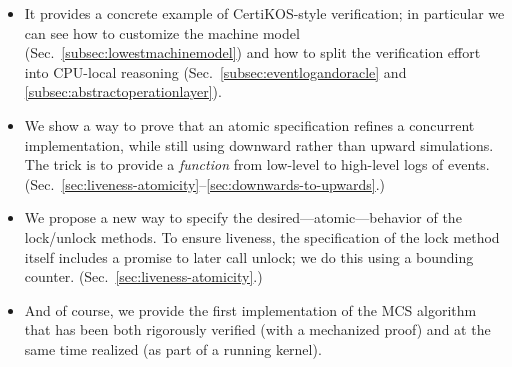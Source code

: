\begin{itemize}
\item It provides a concrete example of CertiKOS-style verification; in particular we can see how to customize the machine model (Sec.~\ref{subsec:lowestmachinemodel}) and how to split the verification effort into CPU-local reasoning (Sec.~\ref{subsec:eventlogandoracle} and \ref{subsec:abstractoperationlayer}).
  
\item We show a way to prove that an atomic specification refines a concurrent implementation, while still using downward rather than upward simulations. The trick is to provide a \emph{function} from low-level to high-level logs of events. (Sec.~\ref{sec:liveness-atomicity}--\ref{sec:downwards-to-upwards}.)

\item We propose a new way to specify the desired---atomic---behavior of the lock/unlock methods. To ensure liveness, the specification of the lock method itself includes a promise to later call unlock; we do this using a bounding counter. (Sec.~\ref{sec:liveness-atomicity}.)

\item And of course, we provide the first implementation of the MCS algorithm that has been both rigorously verified (with a mechanized proof) and at the same time realized (as part of a running kernel).
\end{itemize}



%
%
